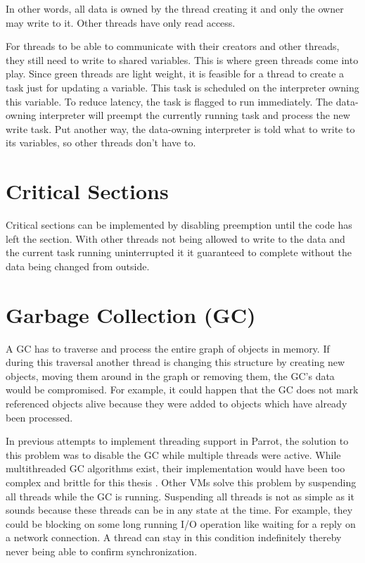 \documentclass[bachelor,english]{hgbthesis}
\begin{document}
In other words, all data is owned by the thread creating it and only the owner may write to it. Other threads have only read access.

For threads to be able to communicate with their creators and other threads, they still need to write to shared variables. This is where green threads come into play. Since green threads are light weight, it is feasible for a thread to create a task just for updating a variable. This task is scheduled on the interpreter owning this variable. To reduce latency, the task is flagged to run immediately. The data-owning interpreter will preempt the currently running task and process the new write task. Put another way, the data-owning interpreter is told what to write to its variables, so other threads don't have to.

\section{Critical Sections}

Critical sections can be implemented by disabling preemption until the code has left the section. With other threads not being allowed to write to the data and the current task running uninterrupted it it guaranteed to complete without the data being changed from outside.

\section{Garbage Collection (GC)}

A GC has to traverse and process the entire graph of objects in memory. If during this traversal another thread is changing this structure by creating new objects, moving them around in the graph or removing them, the GC's data would be compromised. For example, it could happen that the GC does not mark referenced objects alive because they were added to objects which have already been processed.

In previous attempts to implement threading support in Parrot, the solution to this problem was to disable the GC while multiple threads were active. While multithreaded GC algorithms exist, their implementation would have been too complex and brittle for this thesis \cite{VCGC}. Other VMs solve this problem by suspending all threads while the GC is running. Suspending all threads is not as simple as it sounds because these threads can be in any state at the time. For example, they could be blocking on some long running I/O operation like waiting for a reply on a network connection. A thread can stay in this condition indefinitely thereby never being able to confirm synchronization.
\end{document}
